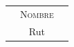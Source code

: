 \documentclass[letterpaper,12pt]{texMemo} %
\begin{document}
\maketitle %





\begin{center}\vspace{1cm}
\begin{tabular}{p{1cm}cp{1cm}}\hline
  &\textsc{Nombre} &\\
  &Rut&\\
\end{tabular}
\end{center}
\end{document}
